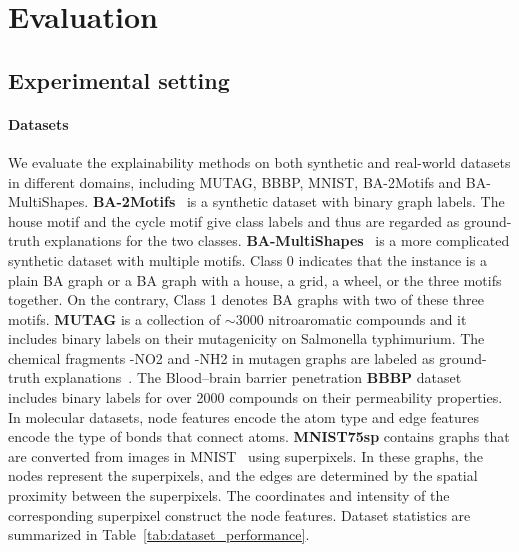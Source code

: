 \section{Evaluation}\label{sec:experiment}

\subsection{Experimental setting}

\paragraph{Datasets} We evaluate the explainability methods on both synthetic and real-world datasets in different domains, including MUTAG, BBBP, MNIST, BA-2Motifs and BA-MultiShapes. \textbf{BA-2Motifs}~\cite{PGExplainer} is a synthetic dataset with binary graph labels. The house motif and the cycle motif give class labels and thus are regarded as ground-truth explanations for the two classes. \textbf{BA-MultiShapes}~\cite{bamultishapes} is a more complicated synthetic dataset with multiple motifs. Class 0 indicates that the instance is a plain BA graph or a BA graph with a house, a grid, a wheel, or the three motifs together. On the contrary, Class 1 denotes BA graphs with two of these three motifs. \textbf{MUTAG} is a collection of $\sim$3000 nitroaromatic compounds and it includes binary labels on their mutagenicity on Salmonella typhimurium. The chemical fragments -NO2 and -NH2 in mutagen graphs are labeled as ground-truth explanations~\cite{PGExplainer}. The Blood–brain barrier penetration \textbf{BBBP} dataset includes binary labels for over 2000 compounds on their permeability properties. In molecular datasets, node features encode the atom type and edge features encode the type of bonds that connect atoms. \textbf{MNIST75sp} contains graphs that are converted from images in MNIST~\cite{lecun1998gradient} using superpixels. In these graphs, the nodes represent the superpixels, and the edges are determined by the spatial proximity between the superpixels. The coordinates and intensity of the corresponding superpixel construct the node features. Dataset statistics are summarized in Table~\ref{tab:dataset_performance}.


